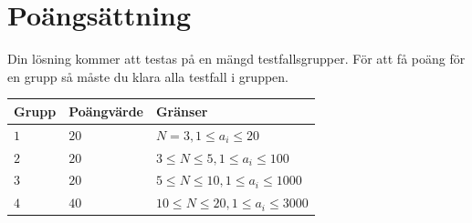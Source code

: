 \section*{Poängsättning}
Din lösning kommer att testas på en mängd testfallsgrupper.
För att få poäng för en grupp så måste du klara alla testfall i gruppen.

\noindent
\begin{tabular}{| l | l | l |}
  \hline
  Grupp & Poängvärde & Gränser \\ \hline
  $1$   & $20$       & $N=3, 1 \leq a_i \leq 20$ \\ \hline
  $2$   & $20$       & $3 \leq N \leq 5, 1 \leq a_i \leq 100$ \\ \hline
  $3$   & $20$       & $5 \leq N \leq 10, 1 \leq a_i \leq 1000$ \\ \hline
  $4$   & $40$       & $10 \leq N \leq 20, 1 \leq a_i \leq 3000$ \\ \hline
\end{tabular}